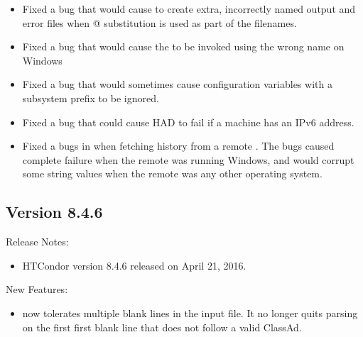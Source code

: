 \begin{itemize}
\item Fixed a bug that would cause  to create extra, incorrectly named
output and error files when \verb@$$@ substitution is used as part of the filenames.

\item Fixed a bug that would cause the  to be invoked using
the wrong name on Windows

\item Fixed a bug that would sometimes cause configuration variables with a subsystem prefix
to be ignored.

\item Fixed a bug that could cause HAD to fail if a machine has an IPv6
address.

\item Fixed a bugs in  when fetching history from a remote . The
bugs caused complete failure when the remote  was running Windows, and
would corrupt some string values when the remote  was any other operating system.

\end{itemize}

\subsection*{\label{sec:New-8-4-6}Version 8.4.6}

\noindent Release Notes:

\begin{itemize}

\item HTCondor version 8.4.6 released on April 21, 2016.

\end{itemize}


\noindent New Features:

\begin{itemize}

\item {}  now tolerates multiple blank lines in the
input file. It no longer quits parsing on the first first blank line that does not
follow a valid ClassAd.

\end{itemize}


